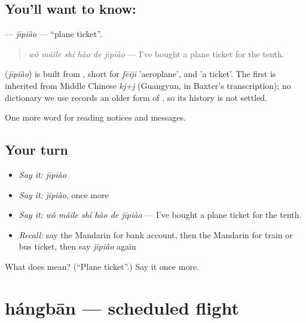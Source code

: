 \subsection*{You'll want to know: }
\textbf{} — \emph{jīpiào} — \textquotedblleft{}plane ticket\textquotedblright{}.

\begin{quote}
\textbf{} \emph{wǒ mǎile shí hào de jīpiào} — I've bought a plane ticket for the tenth.
\end{quote}

\begin{cousinweb}
\textbf{} (\emph{jīpiào}) is built from , short for \emph{fēijī} 'aeroplane', and  'a ticket'. The first is inherited from Middle Chinese \emph{kj+j} (Guangyun, in Baxter's transcription); no dictionary we use records an older form of , so its history is not settled.
\end{cousinweb}

\begin{grammarlens}[title={What you've built}]
One more word for reading notices and messages.
\end{grammarlens}

\subsection*{Your turn}
\begin{itemize}
\raggedright
  \item \emph{Say it:} \emph{jīpiào}
  \item \emph{Say it:} \emph{jīpiào}, once more
  \item \emph{Say it:} \emph{wǒ mǎile shí hào de jīpiào} — I've bought a plane ticket for the tenth.
  \item \emph{Recall:} say the Mandarin for bank account, then the Mandarin for train or bus ticket, then say \emph{jīpiào} again
\end{itemize}

\begin{tcolorbox}[breakable,colback=teal!4,colframe=teal!35!black,title={Before you move on}]
What does  mean? (\textquotedblleft{}Plane ticket\textquotedblright{}.) Say it once more.
\end{tcolorbox}
\section[hángbān]{hángbān — scheduled flight}


